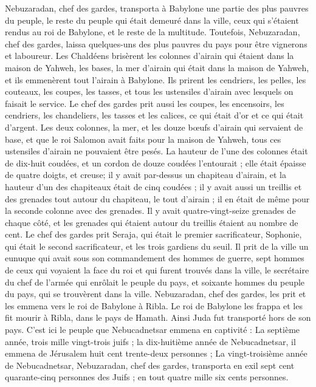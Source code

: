 \begin{multicols}{2}
Nebuzaradan, chef des gardes, transporta à Babylone une partie des plus pauvres du peuple, le reste du peuple qui était demeuré dans la ville, ceux qui s’étaient rendus au roi de Babylone, et le reste de la multitude.
Toutefois, Nebuzaradan, chef des gardes, laissa quelques-uns des plus pauvres du pays pour être vignerons et laboureur.
Les Chaldéens brisèrent les colonnes d'airain qui étaient dans la maison de Yahweh, les bases, la mer d'airain qui était dans la maison de Yahweh, et ils emmenèrent tout l'airain à Babylone.
Ils prirent les cendriers, les pelles, les couteaux, les coupes, les tasses, et tous les ustensiles d'airain avec lesquels on faisait le service.
Le chef des gardes prit aussi les coupes, les encensoirs, les cendriers, les chandeliers, les tasses et les calices, ce qui était d'or et ce qui était d'argent.
Les deux colonnes, la mer, et les douze bœufs d'airain qui servaient de base, et que le roi Salomon avait faits pour la maison de Yahweh, tous ces ustensiles d'airain ne pouvaient être pesés.
La hauteur de l'une des colonnes était de dix-huit coudées, et un cordon de douze coudées l'entourait ; elle était épaisse de quatre doigts, et creuse;
il y avait par-dessus un chapiteau d'airain, et la hauteur d'un des chapiteaux était de cinq coudées ; il y avait aussi un treillis et des grenades tout autour du chapiteau, le tout d'airain ; il en était de même pour la seconde colonne avec des grenades.
Il y avait quatre-vingt-seize grenades de chaque côté, et les grenades qui étaient autour du treillis étaient au nombre de cent.
Le chef des gardes prit Seraja, qui était le premier sacrificateur, Sophonie, qui était le second sacrificateur, et les trois gardiens du seuil.
Il prit de la ville un eunuque qui avait sous son commandement des hommes de guerre, sept hommes de ceux qui voyaient la face du roi et qui furent trouvés dans la ville, le secrétaire du chef de l'armée qui enrôlait le peuple du pays, et soixante hommes du peuple du pays, qui se trouvèrent dans la ville.
Nebuzaradan, chef des gardes, les prit et les emmena vers le roi de Babylone à Ribla.
Le roi de Babylone les frappa et les fit mourir à Ribla, dans le pays de Hamath. Ainsi Juda fut transporté hors de son pays.
C'est ici le peuple que Nebucadnetsar emmena en captivité : La septième année, trois mille vingt-trois juifs ;
la dix-huitième année de Nebucadnetsar, il emmena de Jérusalem huit cent trente-deux personnes ;
La vingt-troisième année de Nebucadnetsar, Nebuzaradan, chef des gardes, transporta en exil sept cent quarante-cinq personnes des Juifs ; en tout quatre mille six cents personnes.

\end{multicols}
